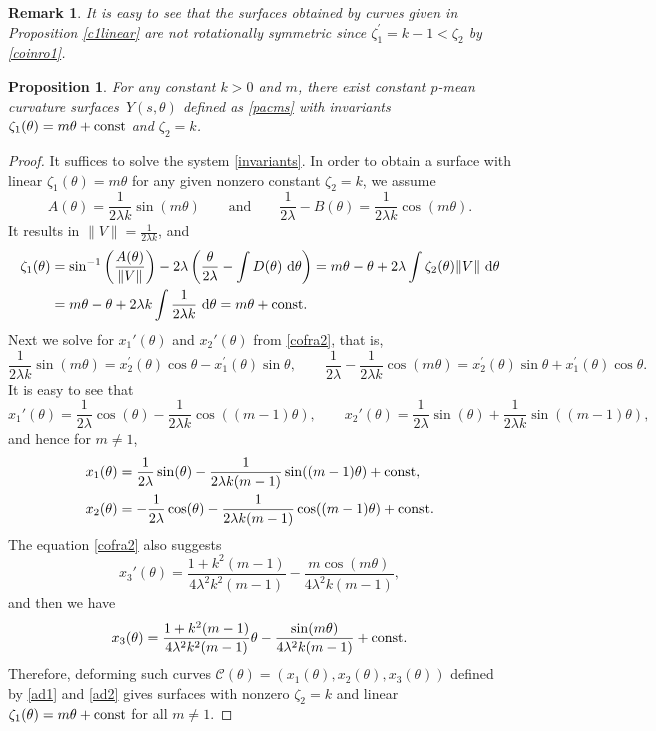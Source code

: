 \documentclass[10pt,a4paper]{amsart}
\numberwithin{equation}{section}
\newtheorem{Proposition}[Theorem]{Proposition}
\newtheorem{Remark}[Theorem]{Remark} }
\begin{document}
\begin{Remark}
It is easy to see that the surfaces obtained by curves given in Proposition \ref{c1linear} are not rotationally symmetric since $\zeta_1^{\prime
}=k-1<\zeta_2$ by \eqref{coinro1}.
\end{Remark}


\begin{Proposition}\label{indepc1}
For any constant $k>0$ and $m$, there exist constant $p$-mean curvature surfaces~$Y(s,\theta)$ defined as \eqref{pacms} with invariants $\zeta_1(\theta)=m\theta+\text{\rm const}$ and $\zeta_2=k$.
\end{Proposition}
\begin{proof}
It suffices to solve the system \eqref{invariants}. In order to obtain a surface with linear $\zeta_1(\theta)=m\theta$ for any given nonzero constant $\zeta_2=k$, we assume
\begin{equation}\label{ae}
A(\theta)=\frac{1}{2\lambda k}\sin(m\theta)\qquad\text{and}\qquad \frac{1}{2\lambda}-B(\theta)=\frac{1}{2\lambda k}\cos(m\theta).
\end{equation}
It results in $\|V\|=\frac{1}{2\lambda k}$, and
\begin{align*}
\zeta_1(\theta)&=\sin^{-1}\left(\frac{A(\theta)}{\|V\|}\right)-2\lambda\left(\frac{\theta}{2\lambda}-\int D(\theta)~{\rm d}\theta\right)=m\theta-\theta+2\lambda\int \zeta_2(\theta)\|V\|~{\rm d}\theta\\
&=m\theta-\theta+2\lambda k\int \frac{1}{2\lambda k}~{\rm d}\theta=m\theta+\text{\rm const}.
\end{align*}
Next we solve for $x_1'(\theta)$ and $x_2'(\theta)$ from \eqref{cofra2}, that is,
\[
\frac{1}{2\lambda k}\sin(m\theta)=x^{\prime }_{2}(\theta)\cos{\theta}-x^{\prime }_{1}(\theta)\sin{
\theta}, \qquad
\frac{1}{2\lambda}-\frac{1}{2\lambda k}\cos(m\theta)=x^{\prime }_{2}(\theta)\sin{\theta}+x^{\prime }_{1}(\theta)\cos{
\theta}.
\]
It is easy to see that
\[
x_1'(\theta)=\frac{1}{2\lambda}\cos(\theta)-\frac{1}{2\lambda k}\cos((m-1)\theta), \qquad x_2'(\theta)=\frac{1}{2\lambda}\sin(\theta)+\frac{1}{2\lambda k}\sin((m-1)\theta),\]
and hence for $m\neq 1$,
\begin{align}
x_1(\theta)&=\frac{1}{2\lambda}\sin(\theta)-\frac{1}{2\lambda k(m-1)}\sin((m-1)\theta)+\text{\rm const},\nonumber\\
x_2(\theta)&=-\frac{1}{2\lambda}\cos(\theta)-\frac{1}{2\lambda k(m-1)}\cos((m-1)\theta)+\text{\rm const}.\label{ad1}
\end{align}
The equation \eqref{cofra2} also suggests
\[x_3'(\theta)=\frac{1+k^2(m-1)}{4\lambda^2k^2(m-1)}-\frac{m\cos(m\theta)}{4\lambda^2k(m-1)},\]
and then we have
\begin{equation}\label{ad2}
x_3(\theta)=\frac{1+k^2(m-1)}{4\lambda^2k^2(m-1)}\theta-\frac{\sin(m\theta)}{4\lambda^2k(m-1)}+\text{\rm const}.
\end{equation}
Therefore, deforming such curves $\mathcal{C}(\theta)=(x_{1}(\theta),x_{2}(\theta),x_{3}(\theta))$ defined by \eqref{ad1} and \eqref{ad2} gives surfaces with nonzero $\zeta_2=k$ and linear $\zeta_1(\theta)=m\theta+\text{\rm const}$ for all $m \neq 1$.


\end{proof}
\end{document}
